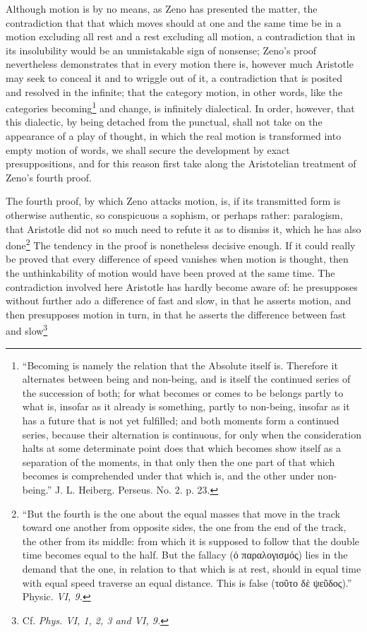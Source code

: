 \documentclass[12pt,a4paper,openany]{book}
\newcommand{\opage}[1]{\marginnote{\footnotesize\textit{[#1]}}}
\begin{document}
Although motion is by no means, as Zeno has presented the matter, the contradiction that that which moves should at one and the same time be in a motion excluding all rest and a rest excluding all motion, a contradiction that in its insolubility would be an unmistakable sign of nonsense; Zeno's proof nevertheless demonstrates that in every motion there is, however much Aristotle may seek to conceal it and to wriggle out of it, a contradiction that is posited and resolved in the infinite; that the category motion, in other words, like the categories becoming\footnote[1]{``Becoming is namely the relation that the Absolute itself is. Therefore it alternates between being and non-being, and is itself the continued series of the succession of both; for what becomes or comes to be belongs partly to what is, insofar as it already is something, partly to non-being, insofar as it has a future that is not yet fulfilled; and both moments form a continued series, because their alternation is continuous, for only when the consideration halts at some determinate point does that which becomes show itself as a separation of the moments, in that only then the one part of that which becomes is comprehended under that which is, and the other under non-being.'' J. L. Heiberg. Perseus. No. 2. p. 23.} and
\setcounter{footnote}{0}%
\opage{141}change, is infinitely dialectical. In order, however, that this dialectic, by being detached from the punctual, shall not take on the appearance of a play of thought, in which the real motion is transformed into empty motion of words, we shall secure the development by exact presuppositions, and for this reason first take along the Aristotelian treatment of Zeno's fourth proof.

The fourth proof, by which Zeno attacks motion, is, if its transmitted form is otherwise authentic, so conspicuous a sophism, or perhaps rather: paralogism, that Aristotle did not so much need to refute it as to dismiss it, which he has also done\footnote[1]{``But the fourth is the one about the equal masses that move in the track toward one another from opposite sides, the one from the end of the track, the other from its middle: from which it is supposed to follow that the double time becomes equal to the half. But the fallacy (ὁ παραλογισμός) lies in the demand that the one, in relation to that which is at rest, should in equal time with equal speed traverse an equal distance. This is false (τοῦτο δὲ ψεῦδος).'' Physic. \textit{VI, 9.}} The tendency in the proof is nonetheless decisive enough. If it could really be proved that every difference of speed vanishes when motion is thought, then the unthinkability of motion would have been proved at the same time. The contradiction involved here Aristotle has hardly become aware of: he presupposes without further ado a difference of fast and slow, in that he asserts motion, and then presupposes motion in turn, in that he asserts the difference between fast and slow\footnote[2]{Cf. \textit{Phys. VI, 1, 2, 3 and VI, 9.}}
\end{document}
